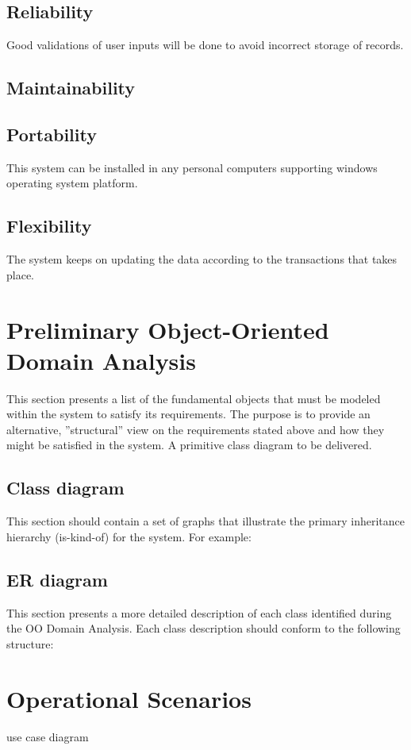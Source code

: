 \documentclass[]{article}
\begin{document}
\subsection {Reliability}
Good validations of user inputs will be done to avoid incorrect storage of records.
\subsection {Maintainability}



\subsection {Portability}
This system can be installed in any personal computers supporting windows operating system platform.
\subsection {Flexibility}
The system keeps on updating the data according to the transactions that takes place.

\section{Preliminary Object-Oriented Domain Analysis}
This section presents a list of the fundamental objects that must be modeled within the system to satisfy its requirements. The purpose is to provide an alternative, ''structural'' view on the requirements stated above and how they might be satisfied in the system. A primitive class diagram to be delivered.

\subsection{Class diagram}
This section should contain a set of graphs that illustrate the primary inheritance hierarchy (is-kind-of) for the system. For example: 



\subsection{ER diagram}
This section presents a more detailed description of each class identified during the OO Domain Analysis.
Each class description should conform to the following structure: 



\section{Operational Scenarios}
use case diagram
\end{document}

